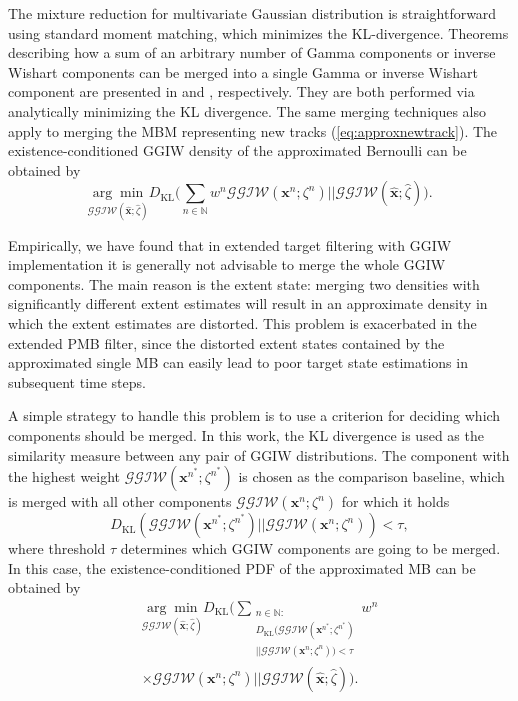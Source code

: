 \documentclass[journal]{IEEEtran}
\begin{document}
The mixture reduction for multivariate Gaussian distribution is straightforward using standard moment matching, which minimizes the KL-divergence. Theorems describing how a sum of an arbitrary number of Gamma components or inverse Wishart components can be merged into a single Gamma or inverse Wishart component are presented in \cite{phdextended} and \cite{gammareduction}, respectively. They are both performed via analytically minimizing the KL divergence. The same merging techniques also apply to merging the MBM representing new tracks (\ref{eq:approxnewtrack}). The existence-conditioned GGIW density of the approximated Bernoulli can be
obtained by
\begin{equation} \underset{\mathcal{GGIW}(\hat{\mathbf{x}};\hat{\zeta})}{\arg\min}D_{\text{KL}}\bigg(\sum_{n\in\mathbb{N}}w^n\mathcal{GGIW}(\mathbf{x}^n;\zeta^n)\big|\big|\mathcal{GGIW}(\hat{\mathbf{x}};\hat{\zeta})\bigg).
\end{equation}

Empirically, we have found that in extended target filtering with GGIW implementation it is generally not advisable to merge the whole GGIW components. The main reason is the extent state: merging two densities with significantly different extent estimates will result in an approximate density in which the extent estimates are distorted. This problem is exacerbated in the extended PMB filter, since the distorted extent states contained by the approximated single MB can easily lead to poor target state estimations in subsequent time steps.

A simple strategy to handle this problem is to use a criterion for deciding which components should be merged. In this work, the KL divergence is used as the similarity measure between any pair of GGIW distributions. The component with the highest weight $\mathcal{GGIW}(\mathbf{x}^{n^*};\zeta^{n^*})$ is chosen as the comparison baseline, which is merged with all other components $\mathcal{GGIW}(\mathbf{x}^{n};\zeta^{n})$ for which it holds
\begin{equation}
    D_{\text{KL}}(\mathcal{GGIW}(\mathbf{x}^{n^*};\zeta^{n^*})||\mathcal{GGIW}(\mathbf{x}^{n};\zeta^{n})) < \tau,
\end{equation}
where threshold $\tau$ determines which GGIW components are going to be merged. 
In this case, the existence-conditioned PDF of the approximated MB can be obtained by
\begin{multline}
\underset{\mathcal{GGIW}(\hat{\mathbf{x}};\hat{\zeta})}{\arg\min}D_{\text{KL}}\bigg(\sum_{\substack{n\in\mathbb{N}:\\D_{\text{KL}}(\mathcal{GGIW}(\mathbf{x}^{n^*};\zeta^{n^*})\\||\mathcal{GGIW}(\mathbf{x}^n;\zeta^n)) < \tau}}w^n\\\times\mathcal{GGIW}(\mathbf{x}^n;\zeta^n)\big|\big|\mathcal{GGIW}(\hat{\mathbf{x}};\hat{\zeta})\bigg).
\end{multline}
\end{document}
